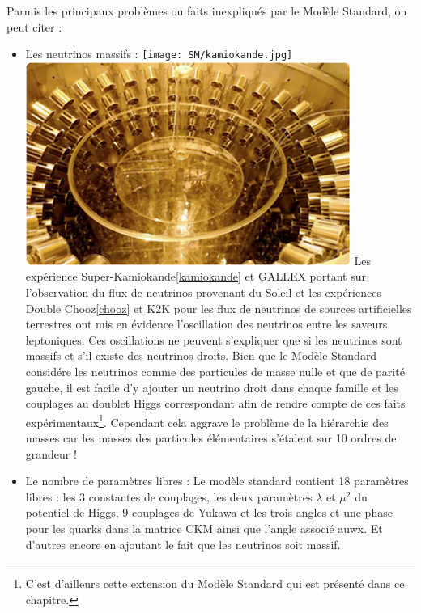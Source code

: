 Parmis les principaux problèmes ou faits inexpliqués par le Modèle Standard, on peut citer :
\begin{itemize}[label=$\bullet$]
\item Les neutrinos massifs :\marginpar
{
\centering
\texttt{[image: SM/kamiokande.jpg]}
\label{kamiokande}
}
\marginpar
{
\centering
\includegraphics[width=\marginparwidth]{SM/chooz.jpg}
\label{chooz}
} Les expérience Super-Kamiokande\ref{kamiokande} et GALLEX portant sur l'observation du flux de neutrinos provenant du Soleil et les expériences Double Chooz\ref{chooz} et K2K pour les flux de neutrinos de sources artificielles terrestres ont mis en évidence l'oscillation des neutrinos entre les saveurs leptoniques. Ces oscillations ne peuvent s'expliquer que si les neutrinos sont massifs et s'il existe des neutrinos droits. Bien que le Modèle Standard considére les neutrinos comme des particules de masse nulle et que de parité gauche, il est facile d'y ajouter un neutrino droit dans chaque famille et les couplages au doublet Higgs correspondant afin de rendre compte de ces faits expérimentaux\footnote{C'est d'ailleurs cette extension du Modèle Standard qui est présenté dans ce chapitre.}. Cependant cela aggrave le problème de la hiérarchie des masses car les masses des particules élémentaires s'étalent sur 10 ordres de grandeur !

\item Le nombre de paramètres libres : Le modèle standard contient 18 paramètres libres : les 3 constantes de couplages, les deux paramètres $\lambda$ et $\mu^2$ du potentiel de Higgs, 9 couplages de Yukawa et les trois angles et une phase pour les quarks dans la matrice CKM ainsi que l'angle associé auwx. Et d'autres encore en ajoutant le fait que les neutrinos soit massif.


\end{itemize}
